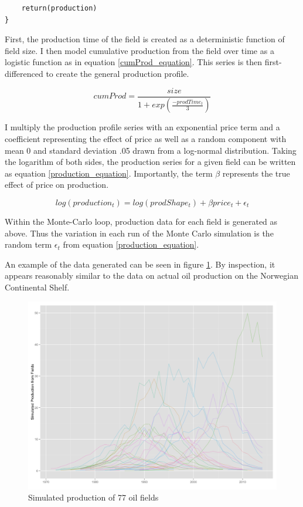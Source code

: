 \documentclass[11pt]{article}
\begin{document}
\begin{spacing}{1}
\begin{verbatim}
	return(production)
}
\end{verbatim}

First, the production time of the field is created as a deterministic function of field size.  I then model cumulative production from the field over time as a logistic function as in equation \ref{cumProd_equation}.  This series is then first-differenced to create the general production profile.  

\begin{equation}
cumProd=\frac{size}{1+exp(\frac{-prodTime_t}{3})}
\label{cumProd_equation}

\end{equation}

I multiply the production profile series with an exponential price term and a coefficient representing the effect of price as well as a random component with mean 0 and standard deviation .05 drawn from a log-normal distribution.  Taking the logarithm of both sides, the production series for a given field can be written as equation \ref{production_equation}.  Importantly, the term $\beta$ represents the true effect of price on production.  

\begin{equation}
log(production_t)=log(prodShape_t) + \beta price_t + \epsilon_t
\label{production_equation}
\end{equation}

Within the Monte-Carlo loop, production data for each field is generated as above.  Thus the variation in each run of the Monte Carlo simulation is the random term $\epsilon_t$ from equation \ref{production_equation}. 

An example of the data generated can be seen in figure \ref{simulated_production}.  By inspection, it appears reasonably similar to the data on actual oil production on the Norwegian Continental Shelf.  

\begin{figure}
	\includegraphics[width=1\textwidth]{figures/simulated_production.png}
	\caption{Simulated production of 77 oil fields}
	\label{simulated_production}	
\end{figure}



\end{spacing}
\end{document}
